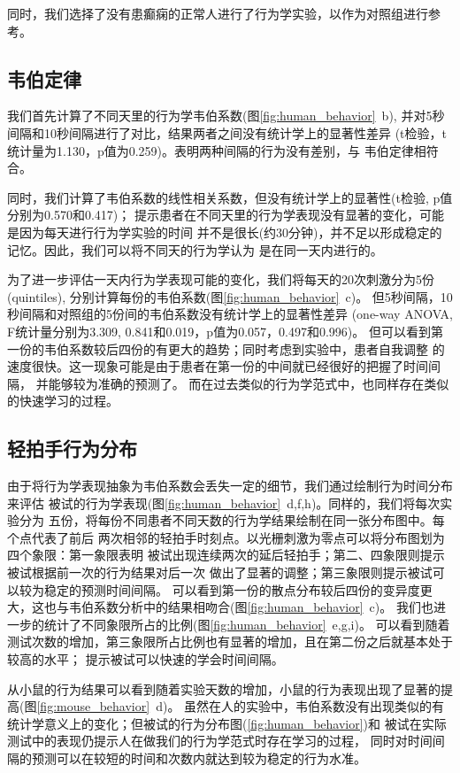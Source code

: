 同时，我们选择了没有患癫痫的正常人进行了行为学实验，以作为对照组进行参考。

\subsection{韦伯定律}
我们首先计算了不同天里的行为学韦伯系数(图\ref{fig:human_behavior}~b),
并对5秒间隔和10秒间隔进行了对比，结果两者之间没有统计学上的显著性差异
(t检验，t统计量为1.130，p值为0.259)。表明两种间隔的行为没有差别，与
韦伯定律相符合\cite{gibbon1977scalar, hardy2018encoding}。

同时，我们计算了韦伯系数的线性相关系数，但没有统计学上的显著性(t检验, p值分别为0.570和0.417)；
提示患者在不同天里的行为学表现没有显著的变化，可能是因为每天进行行为学实验的时间
并不是很长(约30分钟)，并不足以形成稳定的记忆。因此，我们可以将不同天的行为学认为
是在同一天内进行的。

为了进一步评估一天内行为学表现可能的变化，我们将每天的20次刺激分为5份(quintiles),
分别计算每份的韦伯系数(图\ref{fig:human_behavior}~c)。
但5秒间隔，10秒间隔和对照组的5份间的韦伯系数没有统计学上的显著性差异
(one-way ANOVA, F统计量分别为3.309, 0.841和0.019，p值为0.057，0.497和0.996)。
但可以看到第一份的韦伯系数较后四份的有更大的趋势；同时考虑到实验中，患者自我调整
的速度很快。这一现象可能是由于患者在第一份的中间就已经很好的把握了时间间隔，
并能够较为准确的预测了。
而在过去类似的行为学范式中，也同样存在类似的快速学习的过程\cite{simen2011model}。

\subsection{轻拍手行为分布}
由于将行为学表现抽象为韦伯系数会丢失一定的细节，我们通过绘制行为时间分布来评估
被试的行为学表现(图\ref{fig:human_behavior}~d,f,h)。同样的，我们将每次实验分为
五份，将每份不同患者不同天数的行为学结果绘制在同一张分布图中。每个点代表了前后
两次相邻的轻拍手时刻点。以光栅刺激为零点可以将分布图划为四个象限：第一象限表明
被试出现连续两次的延后轻拍手；第二、四象限则提示被试根据前一次的行为结果对后一次
做出了显著的调整；第三象限则提示被试可以较为稳定的预测时间间隔。
可以看到第一份的散点分布较后四份的变异度更大，这也与韦伯系数分析中的结果相吻合(图\ref{fig:human_behavior}~c)。
我们也进一步的统计了不同象限所占的比例(图\ref{fig:human_behavior}~e,g,i)。
可以看到随着测试次数的增加，第三象限所占比例也有显著的增加，且在第二份之后就基本处于较高的水平；
提示被试可以快速的学会时间间隔。

\bigskip
从小鼠的行为结果可以看到随着实验天数的增加，小鼠的行为表现出现了显著的提高(图\ref{fig:mouse_behavior}~d)。
虽然在人的实验中，韦伯系数没有出现类似的有统计学意义上的变化；但被试的行为分布图(\ref{fig:human_behavior})和
被试在实际测试中的表现仍提示人在做我们的行为学范式时存在学习的过程，
同时对时间间隔的预测可以在较短的时间和次数内就达到较为稳定的行为水准。

